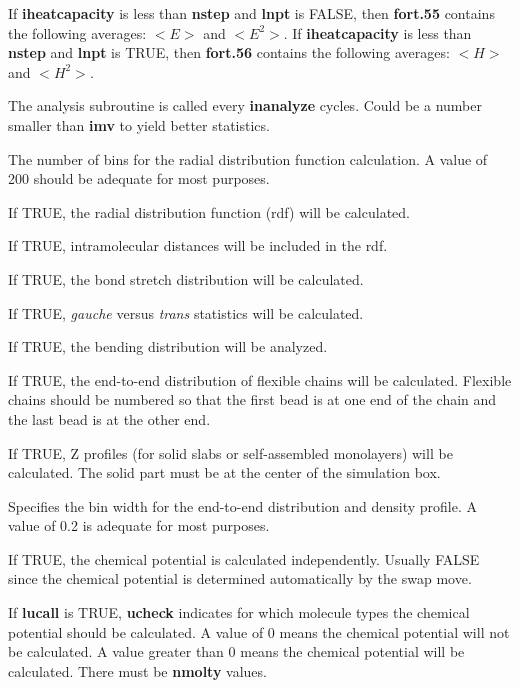 \documentclass[12pt,letterpaper]{article}
\begin{document}
 If {\bf iheatcapacity} is less
than {\bf nstep} and {\bf lnpt} is FALSE, then {\bf fort.55}
contains the following averages: $<E>$ and $<E^2>$. If {\bf
  iheatcapacity} is less than {\bf nstep} and {\bf lnpt} is
TRUE, then {\bf fort.56} contains the following averages:
$<H>$ and $<H^2>$.

 The analysis subroutine is called
every {\bf inanalyze} cycles. Could be a number smaller than
{\bf imv} to yield better statistics.

 The number of bins for the radial
distribution function calculation. A value of 200 should be
adequate for most purposes.

 If TRUE, the radial distribution function (rdf) will be calculated.

 If TRUE, intramolecular distances will be included in the rdf.

 If TRUE, the bond stretch distribution will be calculated.

 If TRUE, \textit{gauche} versus
\textit{trans} statistics will be calculated.

 If TRUE, the bending distribution will be analyzed.

 If TRUE, the end-to-end distribution of
flexible chains will be calculated. Flexible chains should
be numbered so that the first bead is at one end of the
chain and the last bead is at the other end.

 If TRUE, Z profiles (for solid slabs
or self-assembled monolayers) will be calculated. The solid
part must be at the center of the simulation box.

 Specifies the bin width for the
end-to-end distribution and density profile. A value of 0.2
is adequate for most purposes.

 If TRUE, the chemical potential is
calculated independently. Usually FALSE since the chemical
potential is determined automatically by the swap move.

 If {\bf lucall} is TRUE, {\bf ucheck}
indicates for which molecule types the chemical potential
should be calculated. A value of 0 means the chemical
potential will not be calculated. A value greater than 0
means the chemical potential will be calculated. There must
be {\bf nmolty} values.
\end{document}
